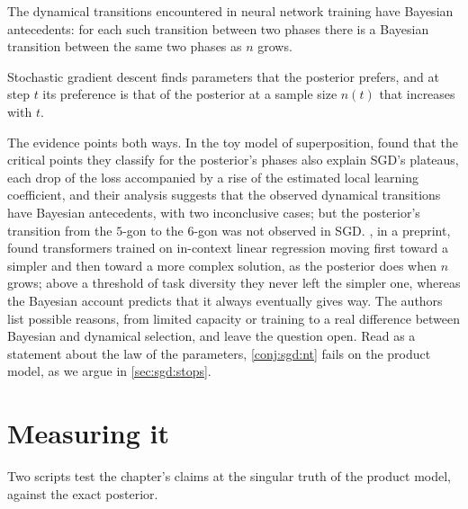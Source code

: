 \begin{refsection}
\begin{conjecture}\label{conj:sgd:bah}
The dynamical transitions encountered in neural network training have Bayesian antecedents: for each such transition between two phases there is a Bayesian transition between the same two phases as $n$ grows.
\end{conjecture}

\begin{conjecture}\label{conj:sgd:nt}
Stochastic gradient descent finds parameters that the posterior prefers, and at step $t$ its preference is that of the posterior at a sample size $n(t)$ that increases with $t$.
\end{conjecture}

The evidence points both ways. In the toy model of superposition, \textcite{ChenEtAl2023} found that the critical points they classify for the posterior's phases also explain SGD's plateaus, each drop of the loss accompanied by a rise of the estimated local learning coefficient, and their analysis suggests that the observed dynamical transitions have Bayesian antecedents, with two inconclusive cases; but the posterior's transition from the $5$-gon to the $6$-gon was not observed in SGD. \textcite{CarrollEtAl2025}, in a preprint, found transformers trained on in-context linear regression moving first toward a simpler and then toward a more complex solution, as the posterior does when $n$ grows; above a threshold of task diversity they never left the simpler one, whereas the Bayesian account predicts that it always eventually gives way. The authors list possible reasons, from limited capacity or training to a real difference between Bayesian and dynamical selection, and leave the question open. Read as a statement about the law of the parameters, \cref{conj:sgd:nt} fails on the product model, as we argue in \cref{sec:sgd:stops}.

\section{Measuring it}\label{sec:sgd:measuring}

Two scripts test the chapter's claims at the singular truth of the product model, against the exact posterior.


\end{refsection}
